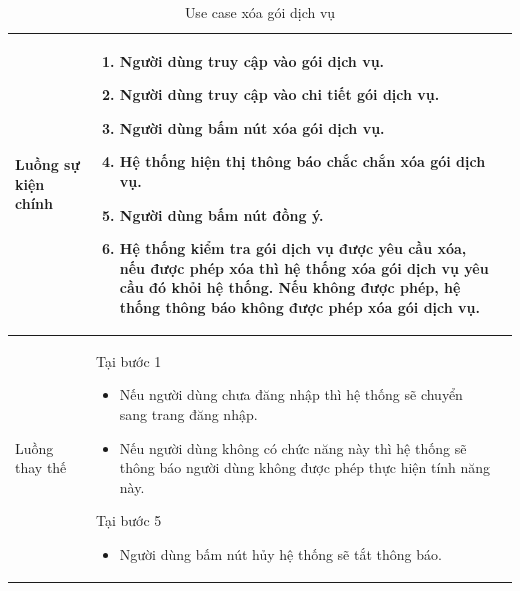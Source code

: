 \documentclass[12pt,a4paper]{article}
\begin{document}
\begin{table}[H]
\begin{tabular}{|p{3.5cm}|p{11.5cm}|c|}
            Luồng sự kiện chính & \vspace{-.8cm}\begin{enumerate}
                                                    \item Người dùng truy cập vào gói dịch vụ.
                                                    \item Người dùng truy cập vào chi tiết gói dịch vụ.
                                                    \item  Người dùng bấm nút xóa gói dịch vụ.
                                                    \item  Hệ thống hiện thị thông báo chắc chắn xóa gói dịch vụ.
                                                    \item  Người dùng bấm nút đồng ý.
                                                    \item Hệ thống kiểm tra gói dịch vụ được yêu cầu xóa, nếu được phép xóa thì hệ thống xóa gói dịch vụ yêu cầu đó khỏi hệ thống. Nếu không được phép, hệ thống thông báo không được phép xóa gói dịch vụ.
            \end{enumerate}
            \\
            \hline
            Luồng thay thế & Tại bước 1\newline
            \vspace{-.8cm}\begin{itemize}
                              \item Nếu người dùng chưa đăng nhập thì hệ thống sẽ chuyển sang trang đăng nhập.
                              \item Nếu người dùng không có chức năng này thì hệ thống sẽ thông báo người dùng không được phép thực hiện tính năng này.
            \end{itemize}

            Tại bước 5\newline
            \vspace{-.8cm}\begin{itemize}
                              \item Người dùng bấm nút hủy hệ thống sẽ tắt thông báo.
            \end{itemize} \\
            \hline
        \end{tabular}
        \caption{Use case xóa gói dịch vụ }

    \end{table}
\end{document}
